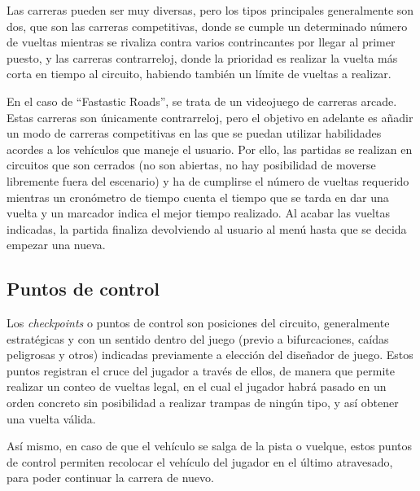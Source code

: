 Las carreras pueden ser muy diversas, pero los tipos principales generalmente son dos, que son las carreras competitivas, donde se cumple un determinado número de vueltas mientras se rivaliza contra varios contrincantes por llegar al primer puesto, y las carreras contrarreloj, donde la prioridad es realizar la vuelta más corta en tiempo al circuito, habiendo también un límite de vueltas a realizar.

En el caso de ``Fastastic Roads'', se trata de un videojuego de carreras arcade. Estas carreras son únicamente contrarreloj, pero el objetivo en adelante es añadir un modo de carreras competitivas en las que se puedan utilizar habilidades acordes a los vehículos que maneje el usuario. Por ello, las partidas se realizan en circuitos que son cerrados (no son abiertas, no hay posibilidad de moverse libremente fuera del escenario) y ha de cumplirse el número de vueltas requerido mientras un cronómetro de tiempo cuenta el tiempo que se tarda en dar una vuelta y un marcador indica el mejor tiempo realizado. Al acabar las vueltas indicadas, la partida finaliza devolviendo al usuario al menú hasta que se decida empezar una nueva.

\subsection{Puntos de control}

Los \textit{checkpoints} o puntos de control son posiciones del circuito, generalmente estratégicas y con un sentido dentro del juego (previo a bifurcaciones, caídas peligrosas y otros) indicadas previamente a elección del diseñador de juego. Estos puntos registran el cruce del jugador a través de ellos, de manera que permite realizar un conteo de vueltas legal, en el cual el jugador habrá pasado en un orden concreto sin posibilidad a realizar trampas de ningún tipo, y así obtener una vuelta válida.

Así mismo, en caso de que el vehículo se salga de la pista o vuelque, estos puntos de control permiten recolocar el vehículo del jugador en el último atravesado, para poder continuar la carrera de nuevo.